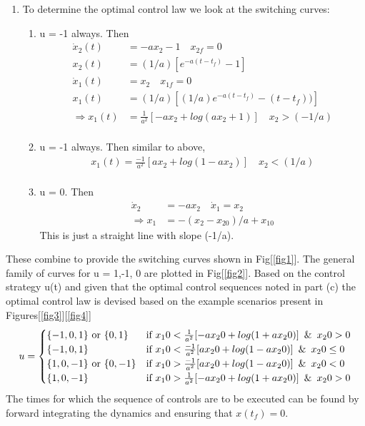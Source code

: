 \begin{enumerate}
\begin{enumerate}
  \item To determine the optimal control law we look at the switching curves:
   \begin{enumerate}
    \item u = -1 always. Then 
    \begin{align*}
     \dot x_2(t) &= -a x_2 - 1 \quad x_{2f} = 0\\
     x_2(t) &= (1/a) [e^{-a(t-t_f)} - 1]\\
     \dot x_1(t) &= x_2 \quad x_{1f} = 0\\
     x_1(t) &= (1/a) [(1/a)e^{-a(t-t_f)} - (t-t_f))]\\
     \Rightarrow x_1(t) &= \frac{1}{a^2} [-ax_2 + log(ax_2 + 1)] \quad x_2 > (-1/a)\\
    \end{align*}
    \item u = -1 always. Then similar to above,
    \begin{align*}
      x_1(t) = \frac{-1}{a^2} [ax_2 + log(1 - ax_2)] \quad x_2 < (1/a)\\
    \end{align*}
    \item u = 0. Then
    \begin{align*}
     \dot x_2 &= -a x_2 \quad \dot x_1 = x_2 \\
     \Rightarrow x_1 &= -(x_2 - x_{20})/a  + x_{10}
    \end{align*}
    This is just a straight line with slope (-1/a).
   \end{enumerate}
  \end{enumerate}
   These combine to provide the switching curves shown in Fig[\ref{fig1}]. The general family of curves for u = 1,-1, 0 are
plotted in Fig[\ref{fig2}]. Based on the control strategy u(t) and given that the  optimal control sequences noted in part (c)
the optimal control law is devised based on the example scenarios present in Figures[\ref{fig3}][\ref{fig4}]
    \begin{align*}
     u = \begin{cases}
          \{-1,0,1 \} \mbox{ or } \{0,1 \} & \mbox{if } x_10 < \frac{1}{a^2} [-ax_20 + log(1 + ax_20)] \enskip\&\enskip x_20 > 0\\
          \{-1,0,1 \}  & \mbox{if } x_10 < \frac{-1}{a^2} [ax_20 + log(1 - ax_20)]\enskip\&\enskip x_20 \le 0\\
          \{1,0,-1 \} \mbox{ or } \{0,-1 \} & \mbox{if } x_10 > \frac{-1}{a^2} [ax_20 + log(1 - ax_20)] \enskip\&\enskip x_20 <
0\\
          \{1,0,-1 \}  & \mbox{if } x_10 > \frac{1}{a^2} [-ax_20 + log(1 + ax_20)] \enskip\&\enskip x_20 > 0\\
         \end{cases}\\
    \end{align*}
    The times for which the sequence of controls are to be executed can be found by forward integrating the dynamics and ensuring
that $x(t_f) = 0$.


\end{enumerate}
